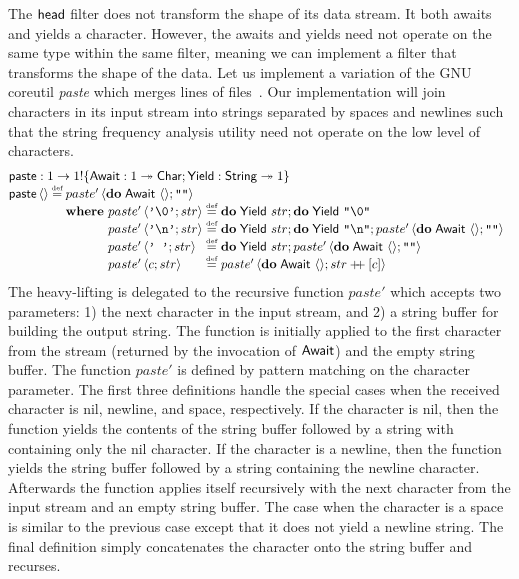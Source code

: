 \documentclass[12pt,phd,lfcs,twoside,openright,logo,leftchapter,normalheadings]{infthesis}
\theoremstyle{plain}
\theoremstyle{definition}
\begin{document}
The $\mathsf{head}$ filter does not transform the shape of its data stream. It
both awaits and yields a character. However, the awaits and yields
need not operate on the same type within the same filter, meaning we
can implement a filter that transforms the shape of the data. Let us
implement a variation of the GNU coreutil \emph{paste} which merges
lines of files~\cite[Section~8.2]{MacKenzieMPPBYS20}. Our
implementation will join characters in its input stream into strings
separated by spaces and newlines such that the string frequency
analysis utility need not operate on the low level of characters.
%
\[
  \bl
    \paste : \UnitType \to \UnitType \eff \{\Await : \UnitType \opto \Char;\Yield : \String \opto \UnitType\}\\
    \paste\,\Unit \defas
      \bl
        paste'\,\Record{\Do\;\Await~\Unit;\strlit{}}\\
        \where
          \ba[t]{@{~}l@{~}c@{~}l}
             paste'\,\Record{\charlit{\textnil};str} &\defas& \Do\;\Yield~str;\Do\;\Yield~\strlit{\textnil}\\
             paste'\,\Record{\charlit{\nl};str} &\defas& \Do\;\Yield~str;\Do\;\Yield~\strlit{\nl};paste'\,\Record{\Do\;\Await~\Unit;\strlit{}}\\
             paste'\,\Record{\charlit{~};str} &\defas& \Do\;\Yield~str;paste'\,\Record{\Do\;\Await~\Unit;\strlit{}}\\
             paste'\,\Record{c;str} &\defas& paste'\,\Record{\Do\;\Await~\Unit;str \concat [c]}

          \ea
      \el
  \el
\]
%
The heavy-lifting is delegated to the recursive function $paste'$
which accepts two parameters: 1) the next character in the input
stream, and 2) a string buffer for building the output string. The
function is initially applied to the first character from the stream
(returned by the invocation of $\mathsf{Await}$) and the empty string
buffer. The function $paste'$ is defined by pattern matching on the
character parameter. The first three definitions handle the special
cases when the received character is nil, newline, and space,
respectively. If the character is nil, then the function yields the
contents of the string buffer followed by a string with containing
only the nil character. If the character is a newline, then the
function yields the string buffer followed by a string containing the
newline character. Afterwards the function applies itself recursively
with the next character from the input stream and an empty string
buffer. The case when the character is a space is similar to the
previous case except that it does not yield a newline string. The
final definition simply concatenates the character onto the string
buffer and recurses.
\end{document}
